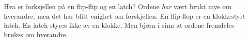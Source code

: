 Hva er forksjellen på en flip-flip og en latch?
Ordene \emph{har} vært brukt mye om hverandre, men det har blitt enighet
om forskjellen.
En flip-flop er en klokkestyrt latch.
En latch styres ikke av en klokke.
Men bjørn i sinn at ordene fremdeles brukes om hverandre.

